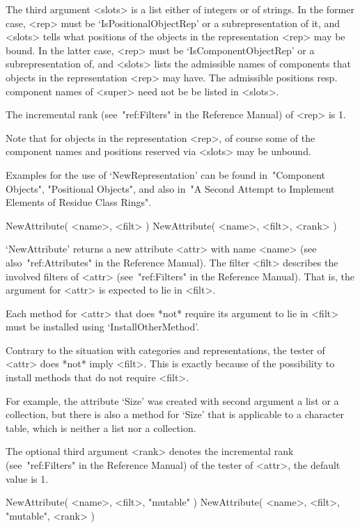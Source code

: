 The third argument <slots> is a list either of integers or of strings.
In the former case, <rep> must be `IsPositionalObjectRep' or a
subrepresentation of it, and <slots> tells what positions of the objects
in the representation <rep> may be bound.
In the latter case, <rep> must be `IsComponentObjectRep' or a
subrepresentation of, and <slots> lists the admissible names of
components that objects in the representation <rep> may have.
The admissible positions resp. component names of <super> need not be
be listed in <slots>.

The incremental rank (see~"ref:Filters" in the Reference Manual)
of <rep> is 1.

Note that for objects in the representation <rep>,
of course some of the component names and positions reserved via <slots>
may be unbound.

Examples for the use of `NewRepresentation' can be found
in~"Component Objects", "Positional Objects", and also
in~"A Second Attempt to Implement Elements of Residue Class Rings".



\>NewAttribute( <name>, <filt> )
\)\fmark NewAttribute( <name>, <filt>, <rank> )

`NewAttribute' returns a new attribute <attr> with name <name>
(see also~"ref:Attributes" in the Reference Manual).
The filter <filt> describes the involved filters of <attr>
(see~"ref:Filters" in the Reference Manual).
That is, the argument for <attr> is expected to lie in <filt>.

Each method for <attr> that does *not* require its argument to lie
in <filt> must be installed using `InstallOtherMethod'.

Contrary to the situation with categories and representations,
the tester of <attr> does *not* imply <filt>.
This is exactly because of the possibility to install methods
that do not require <filt>.

For example, the attribute `Size' was created with second argument
a list or a collection,
but there is also a method for `Size' that is applicable to
a character table, which is neither a list nor a collection.

The optional third argument <rank> denotes the incremental rank
(see~"ref:Filters" in the Reference Manual) of the tester of <attr>,
the default value is 1.

\>NewAttribute( <name>, <filt>, "mutable" )
\)\fmark NewAttribute( <name>, <filt>, "mutable", <rank> )

